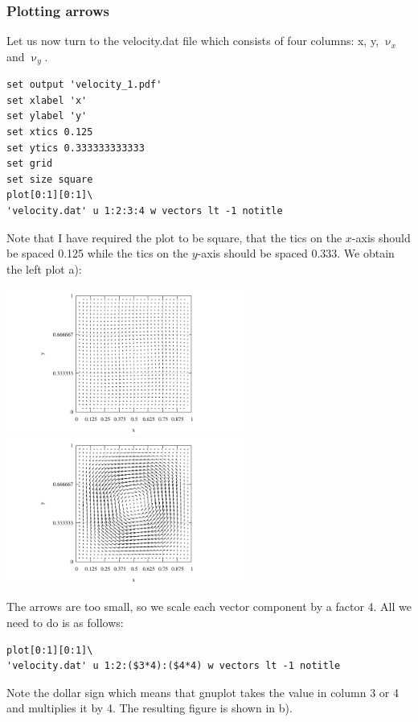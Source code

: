 \subsubsection*{Plotting arrows}

Let us now turn to the {\filenamefont velocity.dat} file which consists of 
four columns: x, y, $\upnu_x$ and $\upnu_y$.

\begin{verbatim}
set output 'velocity_1.pdf'
set xlabel 'x' 
set ylabel 'y' 
set xtics 0.125
set ytics 0.333333333333
set grid
set size square
plot[0:1][0:1]\
'velocity.dat' u 1:2:3:4 w vectors lt -1 notitle 
\end{verbatim}
Note that I have required the plot to be square, that the tics on the 
$x$-axis should be spaced 0.125 while the tics on the $y$-axis should be 
spaced 0.333. 
We obtain the left plot a): 

\begin{center}
\includegraphics[width=8cm]{images/gnuplot/velocity_1.pdf}
\includegraphics[width=8cm]{images/gnuplot/velocity_2.pdf}
\end{center}

The arrows are too small, so we scale each vector component by a factor 4.
All we need to do is as follows:

\begin{verbatim}
plot[0:1][0:1]\
'velocity.dat' u 1:2:($3*4):($4*4) w vectors lt -1 notitle
\end{verbatim}

Note the dollar sign which 
means that gnuplot takes the value in column 3 or 4 and multiplies it by 4.
The resulting figure is shown in b).

